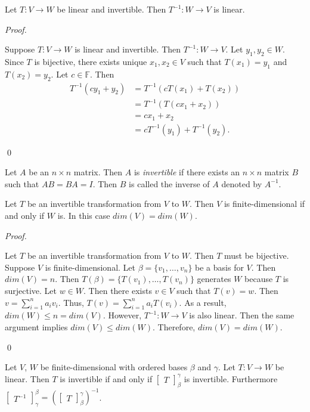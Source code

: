 \documentclass[12pt]{article}
\newenvironment{lemma}[2][Lemma]{\begin{trivlist}
\item[\hskip \labelsep {\bfseries #1}\hskip \labelsep {\bfseries #2.}]}{\end{trivlist}}
\newenvironment{theorem}[2][Theorem]{\begin{trivlist}
\item[\hskip \labelsep {\bfseries #1}\hskip \labelsep {\bfseries #2.}]}{\end{trivlist}}
\newenvironment{definition}[2][Definition]{\begin{trivlist}
\item[\hskip \labelsep {\bfseries #1}\hskip \labelsep {\bfseries #2}]}{\end{trivlist}}
\newenvironment{sol}
    {\emph{Proof.}
    }
    {
    \qed
    }
\begin{document}
\begin{theorem}{2.17}
Let $T : V \to W$ be linear and invertible. Then $T^{-1} : W \to V$ is linear.
\end{theorem}

\begin{sol}
Suppose $T : V \to W$ is linear and invertible. Then $T^{-1} : W \to V$. Let $y_1, y_2 \in W$. Since $T$ is bijective, there exists unique $x_1, x_2 \in V$ such that $T(x_1) = y_1$ and $T(x_2) = y_2$. Let $c \in \mathbb{F}$. Then \begin{align*}
    T^{-1}(cy_1 + y_2) &= T^{-1}(cT(x_1) + T(x_2)) \\ 
    &= T^{-1}(T(cx_1 + x_2)) \\
    &= cx_1 + x_2 \\
    &= cT^{-1}(y_1) + T^{-1}(y_2).
\end{align*} 
\end{sol}

\begin{definition}{7}
Let $A$ be an $n \times n$ matrix. Then $A$ is \textit{invertible} if there exists an $n \times n$ matrix $B$ such that $AB = BA = I$. Then $B$ is called the inverse of $A$ denoted by $A^{-1}$.
\end{definition}

\begin{lemma}{19}
Let $T$ be an invertible transformation from $V$ to $W$. Then $V$ is finite-dimensional if and only if $W$ is. In this case $dim(V) = dim(W)$. 
\end{lemma}

\begin{sol}
Let $T$ be an invertible transformation from $V$ to $W$. Then $T$ must be bijective. Suppose $V$ is finite-dimensional. Let $\beta = \{v _1, \dots, v_n\}$ be a basis for $V$. Then $dim(V) = n$. Then $T(\beta) = \{T(v_1), \dots, T(v_n)\}$ generates $W$ because $T$ is surjective. Let $w \in W$. Then there exists $v \in V$ such that $T(v) = w$. Then $v = \sum_{i = 1}^n a_iv_i$. Thus, $T(v) = \sum_{i = 1}^na_iT(v_i)$. As a result, $dim(W) \leq n = dim(V)$. However, $T^{-1} : W \to V$ is also linear. Then the same argument implies $dim(V) \leq dim(W)$. Therefore, $dim(V) = dim(W)$.
\end{sol}

\begin{theorem}{2.18}
Let $V$, $W$ be finite-dimensional with ordered bases $\beta$ and $\gamma$. Let $T : V \to W$ be linear. Then $T$ is invertible if and only if $\begin{bmatrix} T \end{bmatrix}_\beta^\gamma$ is invertible. Furthermore $\begin{bmatrix} T^{-1} \end{bmatrix}_\gamma^\beta = (\begin{bmatrix} T \end{bmatrix}_\beta^\gamma)^{-1}$.
\end{theorem}
\end{document}
